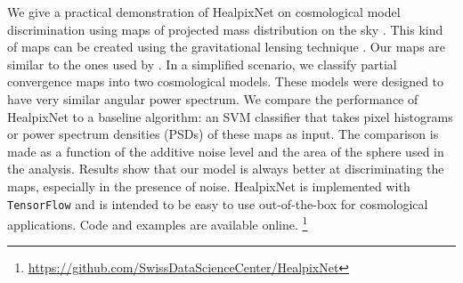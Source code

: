 \documentclass[final,twocolumn,3p,times,sort&compress]{elsarticle}
\newcommand{\secref}[1]{Section~\ref{sec:#1}}
\newcommand{\1}{\b{1}}              %
\newcommand{\0}{\b{0}}              %
\newcommand{\pkg}[1]{\texttt{#1}}
\begin{document}
We give a practical demonstration of HealpixNet on cosmological model discrimination using maps of projected mass distribution on the sky \citep{chang2017curvedsky}.
This kind of maps can be created using the gravitational lensing technique \citep[see][for review]{BartelmannSchneider2001weak}.
Our maps are similar to the ones used by \citep{schmelze2017cosmologicalmodel}.
In a simplified scenario, we classify partial convergence maps into two cosmological models.
These models were designed to have very similar angular power spectrum.
We compare the performance of HealpixNet to a baseline algorithm: an SVM classifier that takes pixel histograms or power spectrum densities (PSDs) of these maps as input.
The comparison is made as a function of the additive noise level and the area of the sphere used in the analysis.
Results show that our model is always better at discriminating the maps, especially in the presence of noise.
HealpixNet is implemented with \pkg{TensorFlow} \citep{abadi2016tensorflow} and is intended to be easy to use out-of-the-box for cosmological applications.
Code and examples are available online.{ \footnote{\url{https://github.com/SwissDataScienceCenter/HealpixNet}}}

\end{document}
